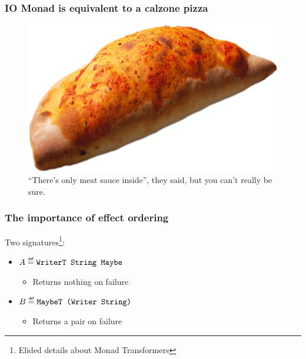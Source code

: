 \begin{frame}
  \frametitle{IO Monad is equivalent to a calzone pizza}
  \begin{center}   
    \begin{figure}
      \includegraphics[scale=0.9]{figures/calzone.jpg}
      \caption{``There's only meat sauce inside'', they said, but you can't really be sure.}
    \end{figure}
  \end{center}  
\end{frame}

\begin{frame}
  \frametitle{The importance of effect ordering \cite{O'Sullivan2008}}
  Two signatures\footnote{Elided details about Monad Transformers}:
  \begin{itemize}
    \item $A \defas \texttt{WriterT String Maybe}$
      \begin{itemize}
        \item Returns nothing on failure
      \end{itemize}
    \item $B \defas \texttt{MaybeT (Writer String)}$
      \begin{itemize}
        \item Returns a pair on failure
      \end{itemize}
  \end{itemize}
\end{frame}

